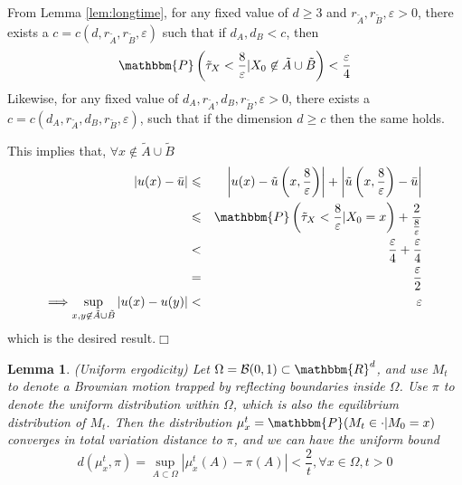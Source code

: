 \documentclass[english, aip, jcp, priprint, graphicx,floatfix]{revtex4-1}
\newcommand{\nin}{\not\in}
\newtheorem{lemma}{Lemma}
\theoremstyle{plain}
\theoremstyle{definition}
\theoremstyle{plain}
\begin{document}
From Lemma \ref{lem:longtime}, for any fixed value of $d \geqslant 3$ and
$r_{\tilde{A}}, r_{\tilde{B}}, \varepsilon > 0$, there exists a $c = c (d,
r_{\tilde{A}}, r_{\tilde{B}}, \varepsilon)$ such that if $d_A, d_B < c$, then
\[ \mathbbm{P} \left( \tilde{\tau}_X < \frac{8}{\varepsilon} |X_0 \nin
\tilde{A} \cup \tilde{B} \right) < \frac{\varepsilon}{4} \]
Likewise, for any fixed value of $d_A, r_{\tilde{A}}, d_B, r_{\tilde{B}},
\varepsilon > 0$, there exists a $c = c (d_A, r_{\tilde{A}}, d_B,
r_{\tilde{B}}, \varepsilon)$, such that if the dimension $d \geqslant c$ then
the same holds.

This implies that, $\forall x \nin \tilde{A} \cup \tilde{B}$
\begin{eqnarray*}
| u (x) - \bar{u} | & \leqslant & \left| u (x) - \tilde{u} \left( x,
\frac{8}{\varepsilon} \right) \right| + \left| \tilde{u} \left( x,
\frac{8}{\varepsilon} \right) - \bar{u} \right|\\
& \leqslant & \mathbbm{P} \left( \tilde{\tau}_X < \frac{8}{\varepsilon}
|X_0 = x \right) + \frac{2}{\frac{8}{\varepsilon}}\\
& < & \frac{\varepsilon}{4} + \frac{\varepsilon}{4}\\
& = & \frac{\varepsilon}{2}\\
\Longrightarrow \sup_{x, y \nin \tilde{A} \cup \tilde{B}} | u (x) - u (y) |
& < & \varepsilon
\end{eqnarray*}
which is the desired result.\hspace*{\fill}$\Box$\medskip

\begin{lemma}
\label{lem:uniform_ergodicity}(Uniform ergodicity) Let $\Omega = \mathcal{B}
(0, 1) \subset \mathbbm{R}^d$, and use $M_t$ to denote a Brownian motion
trapped by reflecting boundaries inside $\Omega$. Use $\pi$ to denote the
uniform distribution within $\Omega$, which is also the equilibrium
distribution of $M_t$. Then the distribution $\mu_x^t =\mathbbm{P} (M_t \in
\cdot |M_0 = x)$ converges in total variation distance to $\pi$, and we can
have the uniform bound
\[ d (\mu_x^t, \pi) = \sup_{A \subset \Omega} | \mu_x^t (A) - \pi (A) | <
\frac{2}{t}, \forall x \in \Omega, t > 0 \]
\end{lemma}
\end{document}
